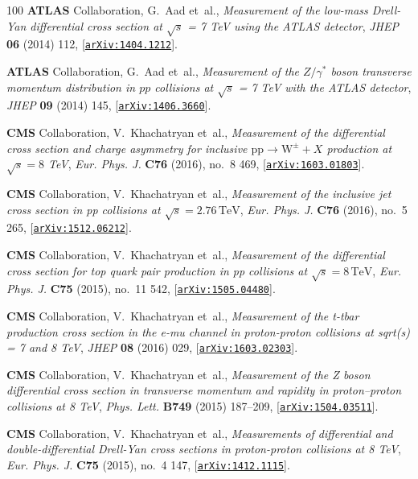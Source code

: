 \begin{thebibliography}{100}
{\bf ATLAS} Collaboration, G.~Aad et~al., {\it {Measurement of the low-mass
  Drell-Yan differential cross section at $\sqrt{s}$ = 7 TeV using the ATLAS
  detector}},  {\em JHEP} {\bf 06} (2014) 112,
  [\href{http://arxiv.org/abs/1404.1212}{{\tt arXiv:1404.1212}}].

{\bf ATLAS} Collaboration, G.~Aad et~al., {\it {Measurement of the $Z/\gamma^*$
  boson transverse momentum distribution in $pp$ collisions at $\sqrt{s}$ = 7
  TeV with the ATLAS detector}},  {\em JHEP} {\bf 09} (2014) 145,
  [\href{http://arxiv.org/abs/1406.3660}{{\tt arXiv:1406.3660}}].

{\bf CMS} Collaboration, V.~Khachatryan et~al., {\it {Measurement of the
  differential cross section and charge asymmetry for inclusive $\mathrm
  {p}\mathrm {p}\rightarrow \mathrm {W}^{\pm }+X$ production at ${\sqrt{s}} =
  8$ TeV}},  {\em Eur. Phys. J.} {\bf C76} (2016), no.~8 469,
  [\href{http://arxiv.org/abs/1603.01803}{{\tt arXiv:1603.01803}}].

{\bf CMS} Collaboration, V.~Khachatryan et~al., {\it {Measurement of the
  inclusive jet cross section in pp collisions at $\sqrt{s} = 2.76\,\text
  {TeV}$}},  {\em Eur. Phys. J.} {\bf C76} (2016), no.~5 265,
  [\href{http://arxiv.org/abs/1512.06212}{{\tt arXiv:1512.06212}}].

{\bf CMS} Collaboration, V.~Khachatryan et~al., {\it {Measurement of the
  differential cross section for top quark pair production in pp collisions at
  $\sqrt{s} = 8\,\text {TeV} $}},  {\em Eur. Phys. J.} {\bf C75} (2015), no.~11
  542, [\href{http://arxiv.org/abs/1505.04480}{{\tt arXiv:1505.04480}}].

{\bf CMS} Collaboration, V.~Khachatryan et~al., {\it {Measurement of the t-tbar
  production cross section in the e-mu channel in proton-proton collisions at
  sqrt(s) = 7 and 8 TeV}},  {\em JHEP} {\bf 08} (2016) 029,
  [\href{http://arxiv.org/abs/1603.02303}{{\tt arXiv:1603.02303}}].

{\bf CMS} Collaboration, V.~Khachatryan et~al., {\it {Measurement of the Z
  boson differential cross section in transverse momentum and rapidity in
  proton–proton collisions at 8 TeV}},  {\em Phys. Lett.} {\bf B749} (2015)
  187--209, [\href{http://arxiv.org/abs/1504.03511}{{\tt arXiv:1504.03511}}].

{\bf CMS} Collaboration, V.~Khachatryan et~al., {\it {Measurements of
  differential and double-differential Drell-Yan cross sections in
  proton-proton collisions at 8 TeV}},  {\em Eur. Phys. J.} {\bf C75} (2015),
  no.~4 147, [\href{http://arxiv.org/abs/1412.1115}{{\tt arXiv:1412.1115}}].


\end{thebibliography}
